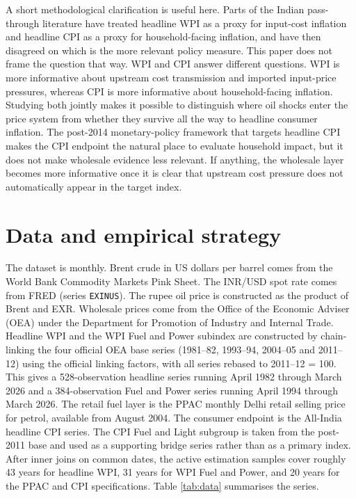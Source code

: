 \documentclass[11pt,a4paper]{article}
\begin{document}
A short methodological clarification is useful here. Parts of the Indian pass-through literature have treated headline WPI as a proxy for input-cost inflation and headline CPI as a proxy for household-facing inflation, and have then disagreed on which is the more relevant policy measure. This paper does not frame the question that way. WPI and CPI answer different questions. WPI is more informative about upstream cost transmission and imported input-price pressures, whereas CPI is more informative about household-facing inflation. Studying both jointly makes it possible to distinguish where oil shocks enter the price system from whether they survive all the way to headline consumer inflation. The post-2014 monetary-policy framework that targets headline CPI \citep{rbi2014} makes the CPI endpoint the natural place to evaluate household impact, but it does not make wholesale evidence less relevant. If anything, the wholesale layer becomes more informative once it is clear that upstream cost pressure does not automatically appear in the target index.

\section{Data and empirical strategy}
\label{sec:data}

The dataset is monthly. Brent crude in US dollars per barrel comes from the World Bank Commodity Markets Pink Sheet. The INR/USD spot rate comes from FRED (series \texttt{EXINUS}). The rupee oil price is constructed as the product of Brent and EXR. Wholesale prices come from the Office of the Economic Adviser (OEA) under the Department for Promotion of Industry and Internal Trade. Headline WPI and the WPI Fuel and Power subindex are constructed by chain-linking the four official OEA base series (1981--82, 1993--94, 2004--05 and 2011--12) using the official linking factors, with all series rebased to 2011--12 = 100. This gives a 528-observation headline series running April 1982 through March 2026 and a 384-observation Fuel and Power series running April 1994 through March 2026. The retail fuel layer is the PPAC monthly Delhi retail selling price for petrol, available from August 2004. The consumer endpoint is the All-India headline CPI series. The CPI Fuel and Light subgroup is taken from the post-2011 base and used as a supporting bridge series rather than as a primary index. After inner joins on common dates, the active estimation samples cover roughly 43 years for headline WPI, 31 years for WPI Fuel and Power, and 20 years for the PPAC and CPI specifications. Table \ref{tab:data} summarises the series.
\end{document}

